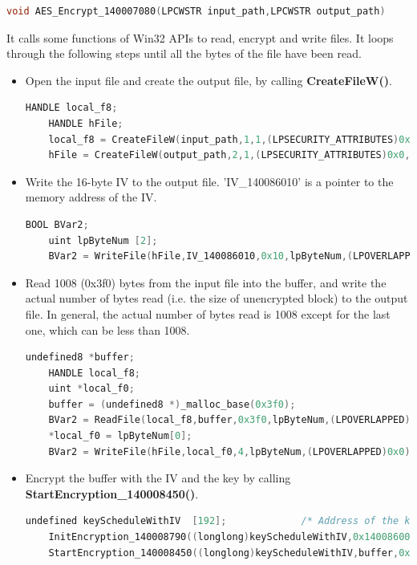 \documentclass[11pt]{article}
\begin{document}
\begin{lstlisting}[language=c++]
void AES_Encrypt_140007080(LPCWSTR input_path,LPCWSTR output_path)
\end{lstlisting}

It calls some functions of Win32 APIs to read, encrypt and write files. It loops through the following steps until all the bytes of the file have been read.

\begin{itemize}
  \item Open the input file and create the output file, by calling \textbf{CreateFileW()}.
  \begin{lstlisting}[language=c++]
    HANDLE local_f8;
    HANDLE hFile;
    local_f8 = CreateFileW(input_path,1,1,(LPSECURITY_ATTRIBUTES)0x0,3,0x80,(HANDLE)0x0);
    hFile = CreateFileW(output_path,2,1,(LPSECURITY_ATTRIBUTES)0x0,4,0x80(HANDLE)0x0);\end{lstlisting}
  
  \item Write the 16-byte IV to the output file. 'IV\_140086010' is a pointer to the memory address of the IV.
  \begin{lstlisting}[language=c++]
    BOOL BVar2;
    uint lpByteNum [2];
    BVar2 = WriteFile(hFile,IV_140086010,0x10,lpByteNum,(LPOVERLAPPED)0x0)\end{lstlisting}

  \item Read 1008 (0x3f0) bytes from the input file into the buffer, and write the actual number of bytes read (i.e. the size of unencrypted block) to the output file. In general, the actual number of bytes read is 1008 except for the last one, which can be less than 1008.
  \begin{lstlisting}[language=c++]
    undefined8 *buffer;
    HANDLE local_f8;
    uint *local_f0;
    buffer = (undefined8 *)_malloc_base(0x3f0);
    BVar2 = ReadFile(local_f8,buffer,0x3f0,lpByteNum,(LPOVERLAPPED)0x0);
    *local_f0 = lpByteNum[0];
    BVar2 = WriteFile(hFile,local_f0,4,lpByteNum,(LPOVERLAPPED)0x0);\end{lstlisting}

  \item Encrypt the buffer with the IV and the key by calling \textbf{StartEncryption\_140008450()}.
  \begin{lstlisting}[language=c++]
    undefined keyScheduleWithIV  [192];             /* Address of the key*/
    InitEncryption_140008790((longlong)keyScheduleWithIV,0x140086000,(undefined8 *)IV_140086010);
    StartEncryption_140008450((longlong)keyScheduleWithIV,buffer,0x3f0);\end{lstlisting}


\end{itemize}
\end{document}
